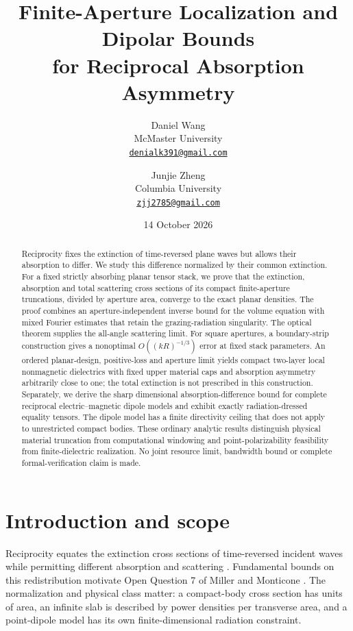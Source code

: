 \documentclass[11pt,a4paper]{article}
\title{Finite-Aperture Localization and Dipolar Bounds\\for Reciprocal Absorption Asymmetry}
\author{Daniel Wang\\McMaster University\\\href{mailto:denialk391@gmail.com}{\texttt{denialk391@gmail.com}} \and Junjie Zheng\\Columbia University\\\href{mailto:zjj2785@gmail.com}{\texttt{zjj2785@gmail.com}}}
\date{14 October 2026}
\theoremstyle{remark}
\begin{document}
\maketitle
\begin{abstract}
Reciprocity fixes the extinction of time-reversed plane waves but allows their absorption to differ. We study this difference normalized by their common extinction. For a fixed strictly absorbing planar tensor stack, we prove that the extinction, absorption and total scattering cross sections of its compact finite-aperture truncations, divided by aperture area, converge to the exact planar densities. The proof combines an aperture-independent inverse bound for the volume equation with mixed Fourier estimates that retain the grazing-radiation singularity. The optical theorem supplies the all-angle scattering limit. For square apertures, a boundary-strip construction gives a nonoptimal $O((kR)^{-1/3})$ error at fixed stack parameters. An ordered planar-design, positive-loss and aperture limit yields compact two-layer local nonmagnetic dielectrics with fixed upper material caps and absorption asymmetry arbitrarily close to one; the total extinction is not prescribed in this construction. Separately, we derive the sharp dimensional absorption-difference bound for complete reciprocal electric--magnetic dipole models and exhibit exactly radiation-dressed equality tensors. The dipole model has a finite directivity ceiling that does not apply to unrestricted compact bodies. These ordinary analytic results distinguish physical material truncation from computational windowing and point-polarizability feasibility from finite-dielectric realization. No joint resource limit, bandwidth bound or complete formal-verification claim is made.
\end{abstract}

\section{Introduction and scope}
Reciprocity equates the extinction cross sections of time-reversed incident waves while permitting different absorption and scattering \citep{SounasAlu2014}. Fundamental bounds on this redistribution motivate Open Question 7 of Miller and Monticone \citep{MillerMonticone2026}. The normalization and physical class matter: a compact-body cross section has units of area, an infinite slab is described by power densities per transverse area, and a point-dipole model has its own finite-dimensional radiation constraint.
\end{document}

